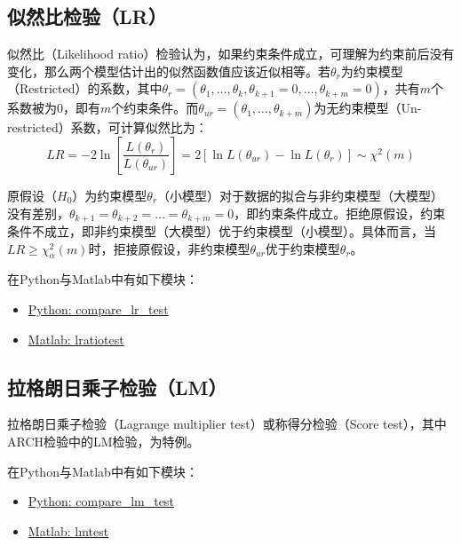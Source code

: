 \documentclass[11pt]{article}
\begin{document}
\subsection{似然比检验（LR）}

似然比（Likelihood ratio）检验认为，如果约束条件成立，可理解为约束前后没有变化，那么两个模型估计出的似然函数值应该近似相等。若$\theta_{r}$为约束模型（Restricted）的系数，其中$\theta_{r} = (\theta_1,\dots,\theta_k,\theta_{k+1}=0,\dots,\theta_{k+m}=0)$，共有$m$个系数被为0，即有$m$个约束条件。而$\theta_{ur} = (\theta_1,\dots,\theta_{k+m})$为无约束模型（Un-restricted）系数，可计算似然比为：
\begin{equation*}
    LR = -2\ln \left[ \frac{L(\theta_{r})}{L(\theta_{ur})} \right]
    = 2\left[ \ln L(\theta_{ur}) - \ln L(\theta_{r}) \right]
    \sim \chi^2(m)
\end{equation*}

原假设（$H_0$）为约束模型$\theta_r$（小模型）对于数据的拟合与非约束模型（大模型）没有差别，$\theta_{k+1}=\theta_{k+2}=\dots=\theta_{k+m}=0$，即约束条件成立。拒绝原假设，约束条件不成立，即非约束模型（大模型）优于约束模型（小模型）。具体而言，当$LR \geq \chi_{\alpha}^2(m)$时，拒接原假设，非约束模型$\theta_{ur}$优于约束模型$\theta_{r}$。

\begin{remark}
    在Python与Matlab中有如下模块：
    \begin{itemize}
        \item \href{https://www.statsmodels.org/dev/generated/statsmodels.regression.linear_model.OLSResults.compare_lr_test.html}{Python: compare\_lr\_test}
        \item \href{https://www.mathworks.com/help/econ/lratiotest.html}{Matlab: lratiotest}
    \end{itemize}
\end{remark}

\subsection{拉格朗日乘子检验（LM）}

拉格朗日乘子检验（Lagrange multiplier test）或称得分检验（Score test），其中ARCH检验中的LM检验，为特例。

\begin{remark}
    在Python与Matlab中有如下模块：
    \begin{itemize}
        \item \href{https://www.statsmodels.org/stable/generated/statsmodels.regression.linear_model.RegressionResults.compare_lm_test.html}{Python: compare\_lm\_test}
        \item \href{https://www.mathworks.com/help/econ/lmtest.html}{Matlab: lmtest}
    \end{itemize}
\end{remark}
\end{document}
